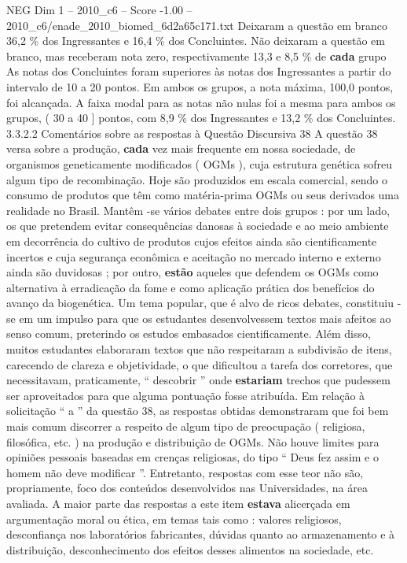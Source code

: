 \begin{textsample}{NEG Dim 1 – 2010\_c6 – Score -1.00 – 2010\_c6/enade\_2010\_biomed\_6d2a65c171.txt}
Deixaram a questão em branco 36,2 \% dos Ingressantes e 16,4 \% dos Concluintes.
Não deixaram a questão em branco, mas receberam nota zero, respectivamente 13,3 e 8,5 \% de \textbf{cada} grupo As notas dos Concluintes foram superiores às notas dos Ingressantes a partir do intervalo de 10 a 20 pontos.
Em ambos os grupos, a nota máxima, 100,0 pontos, foi alcançada.
A faixa modal para as notas não nulas foi a mesma para ambos os grupos, ( 30 a 40 ] pontos, com 8,9 \% dos Ingressantes e 13,2 \% dos Concluintes. 3.3.2.2 Comentários sobre as respostas à Questão Discursiva 38 A questão 38 versa sobre a produção, \textbf{cada} vez mais frequente em nossa sociedade, de organismos geneticamente modificados ( OGMs ), cuja estrutura genética sofreu algum tipo de recombinação.
Hoje são produzidos em escala comercial, sendo o consumo de produtos que têm como matéria-prima OGMs ou seus derivados uma realidade no Brasil.
Mantêm -se vários debates entre dois grupos : por um lado, os que pretendem evitar consequências danosas à sociedade e ao meio ambiente em decorrência do cultivo de produtos cujos efeitos ainda são cientificamente incertos e cuja segurança econômica e aceitação no mercado interno e externo ainda são duvidosas ; por outro, \textbf{estão} aqueles que defendem os OGMs como alternativa à erradicação da fome e como aplicação prática dos benefícios do avanço da biogenética.
Um tema popular, que é alvo de ricos debates, constituiu -se em um impulso para que os estudantes desenvolvessem textos mais afeitos ao senso comum, preterindo os estudos embasados cientificamente.
Além disso, muitos estudantes elaboraram textos que não respeitaram a subdivisão de itens, carecendo de clareza e objetividade, o que dificultou a tarefa dos corretores, que necessitavam, praticamente, “ descobrir ” onde \textbf{estariam} trechos que pudessem ser aproveitados para que alguma pontuação fosse atribuída.
Em relação à solicitação “ a ” da questão 38, as respostas obtidas demonstraram que foi bem mais comum discorrer a respeito de algum tipo de preocupação ( religiosa, filosófica, etc. ) na produção e distribuição de OGMs.
Não houve limites para opiniões pessoais baseadas em crenças religiosas, do tipo “ Deus fez assim e o homem não deve modificar ”.
Entretanto, respostas com esse teor não são, propriamente, foco dos conteúdos desenvolvidos nas Universidades, na área avaliada.
A maior parte das respostas a este item \textbf{estava} alicerçada em argumentação moral ou ética, em temas tais como : valores religiosos, desconfiança nos laboratórios fabricantes, dúvidas quanto ao armazenamento e à distribuição, desconhecimento dos efeitos desses alimentos na sociedade, etc.

\end{textsample}
